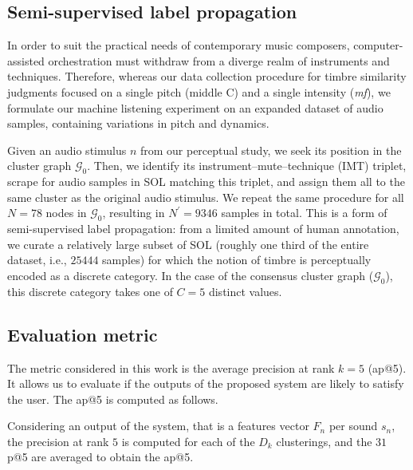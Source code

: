 \documentclass{bmcart}
\begin{document}



\subsection*{Semi-supervised label propagation}

In order to suit the practical needs of contemporary music composers, computer-assisted orchestration must withdraw from a diverge realm of instruments and techniques.
Therefore, whereas our data collection procedure for timbre similarity judgments focused on a single pitch (middle C) and a single intensity (\emph{mf}), we formulate our machine listening experiment on an expanded dataset of audio samples, containing variations in pitch and dynamics.

Given an audio stimulus $n$ from our perceptual study, we seek its position in the cluster graph $\mathcal{G}_0$.
Then, we identify its instrument--mute--technique (IMT) triplet, scrape for audio samples in SOL matching this triplet, and assign them all to the same cluster as the original audio stimulus.
We repeat the same procedure for all $N=78$ nodes in $\mathcal{G}_0$, resulting in $N^\prime = 9346$ samples in total.
This is a form of semi-supervised label propagation: from a limited amount of human annotation, we curate a relatively large subset of SOL (roughly one third of the entire dataset, i.e., $25444$ samples) for which the notion of timbre is perceptually encoded as a discrete category.
In the case of the consensus cluster graph ($\mathcal{G}_0$), this discrete category takes one of $C=5$ distinct values.

\subsection*{Evaluation metric}


The metric considered in this work is the average precision at rank $k=5$ (ap@5).
It allows us to evaluate if the outputs of the proposed system are likely to satisfy the user.
The ap@5 is computed as follows.

Considering an output of the system, that is a features vector $F_n$ per sound $s_n$, the precision at rank $5$ is computed for each of the $D_k$ clusterings, and the $31$ p@5 are averaged to obtain the ap@5.
\end{document}
